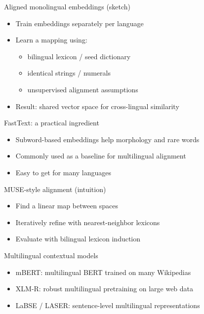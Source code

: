 \documentclass{beamer}
\begin{document}
\begin{frame}{Aligned monolingual embeddings (sketch)}
\begin{itemize}
  \item Train embeddings separately per language
  \item Learn a mapping using:
  \begin{itemize}
    \item bilingual lexicon / seed dictionary
    \item identical strings / numerals
    \item unsupervised alignment assumptions
  \end{itemize}
  \item Result: shared vector space for cross-lingual similarity
\end{itemize}
\end{frame}

\begin{frame}{FastText: a practical ingredient}
\begin{itemize}
  \item Subword-based embeddings help morphology and rare words
  \item Commonly used as a baseline for multilingual alignment
  \item Easy to get for many languages
\end{itemize}
\end{frame}

\begin{frame}{MUSE-style alignment (intuition)}
\begin{itemize}
  \item Find a linear map between spaces
  \item Iteratively refine with nearest-neighbor lexicons
  \item Evaluate with bilingual lexicon induction
\end{itemize}
\end{frame}

\begin{frame}{Multilingual contextual models}
\begin{itemize}
  \item mBERT: multilingual BERT trained on many Wikipedias
  \item XLM-R: robust multilingual pretraining on large web data
  \item LaBSE / LASER: sentence-level multilingual representations
\end{itemize}
\end{frame}
\end{document}
